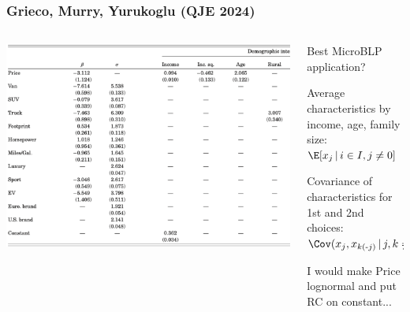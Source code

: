 \begin{frame}\frametitle{Grieco, Murry, Yurukoglu (QJE 2024)}
\begin{columns}
\begin{column}{0.66\textwidth}
     \includegraphics[width=\textwidth]{resources/gmy1}      
\end{column}
\begin{column}{0.33\textwidth}
Best MicroBLP application?
\begin{wideitemize}
\item  Average characteristics by income, age, family size:\\
$\E[x_j \,|\, i \in I, j \neq 0]$
\item Covariance of characteristics for 1st and 2nd choices:\\ $\Cov(x_j, x_{k(\text{-}j)} \,|\, j, k \neq 0)$
\item I would make Price lognormal and put RC on constant...
\end{wideitemize}
\end{column}
\end{columns}
\end{frame}


